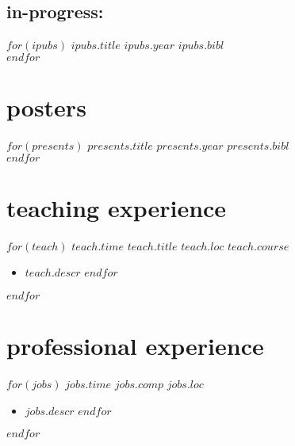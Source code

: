 \documentclass[]{friggeri-cv}
\begin{document}
\vspace{-0.15in}
\subsection{in-progress:}
\begin{entrylist}
$for(ipubs)$
  \entrypub
  {$ipubs.title$}
  {$ipubs.year$}
  {$ipubs.bibl$}\\
$endfor$
\end{entrylist}



\vspace{-0.15in}

\section{posters}
\begin{entrylist}
$for(presents)$
  \entrypub
  {$presents.title$}
  {$presents.year$}
  {$presents.bibl$}\\
$endfor$
\end{entrylist}



\vspace{-0.15in}

\section{teaching experience}
\begin{entrylist}
$for(teach)$
  \entry
  {$teach.time$}
  {$teach.title$}
  {$teach.loc$}
  {$teach.course$}
  \setlength\parskip{0pt}
  \begin{itemize}[noitemsep, leftmargin=0.2in]
    $for(teach.descr)$
      \item $teach.descr$
    $endfor$
  \end{itemize}
  \setlength\parskip{12pt}
$endfor$
\end{entrylist}




\section{professional experience}
\begin{entrylist}
$for(jobs)$
  \entryalt
  {$jobs.time$}
  {$jobs.comp$}
  {$jobs.loc$}
  \setlength\parskip{0pt}
  \begin{itemize}[noitemsep, leftmargin=0.2in]
    $for(jobs.descr)$
      \item $jobs.descr$
    $endfor$
  \end{itemize}
  \setlength\parskip{12pt}
$endfor$
\end{entrylist}
\end{document}

